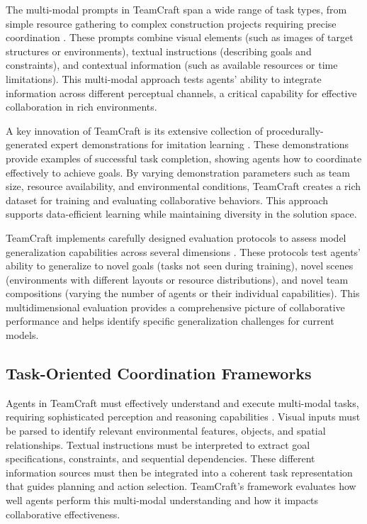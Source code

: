 \documentclass[a4paper, 12pt]{article}
\begin{document}
The multi-modal prompts in TeamCraft span a wide range of task types, from simple resource gathering to complex construction projects requiring precise coordination \autocite{long2024teamcraftbenchmarkmultimodalmultiagent}. These prompts combine visual elements (such as images of target structures or environments), textual instructions (describing goals and constraints), and contextual information (such as available resources or time limitations). This multi-modal approach tests agents' ability to integrate information across different perceptual channels, a critical capability for effective collaboration in rich environments.

A key innovation of TeamCraft is its extensive collection of procedurally-generated expert demonstrations for imitation learning \autocite{long2024teamcraftbenchmarkmultimodalmultiagent}. These demonstrations provide examples of successful task completion, showing agents how to coordinate effectively to achieve goals. By varying demonstration parameters such as team size, resource availability, and environmental conditions, TeamCraft creates a rich dataset for training and evaluating collaborative behaviors. This approach supports data-efficient learning while maintaining diversity in the solution space.

TeamCraft implements carefully designed evaluation protocols to assess model generalization capabilities across several dimensions \autocite{long2024teamcraftbenchmarkmultimodalmultiagent}. These protocols test agents' ability to generalize to novel goals (tasks not seen during training), novel scenes (environments with different layouts or resource distributions), and novel team compositions (varying the number of agents or their individual capabilities). This multidimensional evaluation provides a comprehensive picture of collaborative performance and helps identify specific generalization challenges for current models.

\subsection{Task-Oriented Coordination Frameworks}

Agents in TeamCraft must effectively understand and execute multi-modal tasks, requiring sophisticated perception and reasoning capabilities \autocite{long2024teamcraftbenchmarkmultimodalmultiagent}. Visual inputs must be parsed to identify relevant environmental features, objects, and spatial relationships. Textual instructions must be interpreted to extract goal specifications, constraints, and sequential dependencies. These different information sources must then be integrated into a coherent task representation that guides planning and action selection. TeamCraft's framework evaluates how well agents perform this multi-modal understanding and how it impacts collaborative effectiveness.
\end{document}
